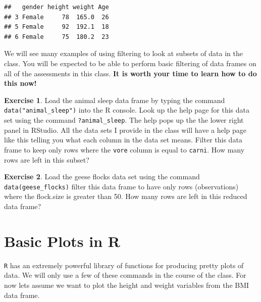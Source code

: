 \documentclass[
]{book}
\newenvironment{Shaded}{\begin{snugshade}}{\end{snugshade}}
\newcommand{\FunctionTok}[1]{\textcolor[rgb]{0.00,0.00,0.00}{#1}}
\newcommand{\NormalTok}[1]{#1}
\newcommand{\SpecialCharTok}[1]{\textcolor[rgb]{0.00,0.00,0.00}{#1}}
\theoremstyle{definition}
\theoremstyle{definition}
\theoremstyle{definition}
\newtheorem{exercise}{Exercise}[chapter]
\theoremstyle{definition}
\theoremstyle{remark}
\begin{document}
\begin{verbatim}
##   gender height weight Age
## 3 Female     78  165.0  26
## 5 Female     92  192.1  18
## 6 Female     75  180.2  23
\end{verbatim}

We will see many examples of using filtering to look at subsets of data in the class. You will be expected to be able to perform basic filtering of data frames on all of the assessments in this class. \textbf{It is worth your time to learn how to do this now!}

\begin{exercise}
\protect\hypertarget{exr:unnamed-chunk-47}{}\label{exr:unnamed-chunk-47}Load the animal sleep data frame by typing the command \texttt{data("animal\_sleep")} into the R console. Look up the help page for this data set using the command \texttt{?animal\_sleep}. The help pops up the the lower right panel in RStudio. All the data sets I provide in the class will have a help page like this telling you what each column in the data set means. Filter this data frame to keep only rows where the \texttt{vore} column is equal to \texttt{carni}. How many rows are left in this subset?
\end{exercise}

\begin{exercise}
\protect\hypertarget{exr:unnamed-chunk-48}{}\label{exr:unnamed-chunk-48}Load the geese flocks data set using the command \texttt{data(geese\_flocks)} filter this data frame to have only rows (observations) where the flock.size is greater than 50. How many rows are left in this reduced data frame?
\end{exercise}

\hypertarget{basic-plots-in-r}{%
\section{Basic Plots in R}\label{basic-plots-in-r}}

\texttt{R} has an extremely powerful library of functions for producing pretty plots of data. We will only use a few of these commands in the course of the class. For now lets assume we want to plot the height and weight variables from the BMI data frame.

\begin{Shaded}
\end{Shaded}
\end{document}
